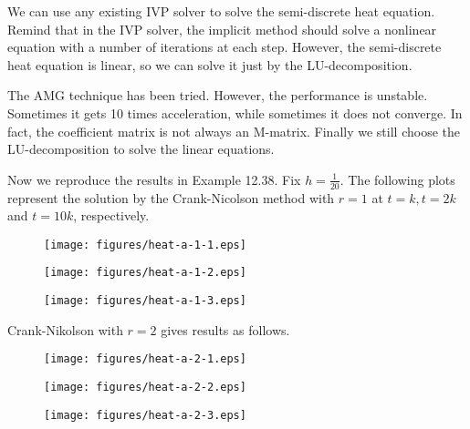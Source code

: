 \documentclass[twocolumn,10pt]{article}
\begin{document}
We can use any existing IVP solver to solve the semi-discrete heat equation. Remind that in the IVP solver, the implicit method should solve a nonlinear equation with a number of iterations at each step. However, the semi-discrete heat equation is linear, so we can solve it just by the LU-decomposition.

The AMG technique has been tried. However, the performance is unstable. Sometimes it gets 10 times acceleration, while sometimes it does not converge. In fact, the coefficient matrix is not always an M-matrix. Finally we still choose the LU-decomposition to solve the linear equations.

Now we reproduce the results in Example 12.38. Fix $h=\frac{1}{20}$. The following plots represent the solution by the Crank-Nicolson method with $r=1$ at $t=k, t=2k$ and $t=10k$, respectively.

\vspace{-.3em}\begin{figure}[H]
    \centering
    \begin{minipage}[t]{0.32\linewidth}
        \centering
        \texttt{[image: figures/heat-a-1-1.eps]}
    \end{minipage}
    \begin{minipage}[t]{0.32\linewidth}
        \centering
        \texttt{[image: figures/heat-a-1-2.eps]}
    \end{minipage}
    \begin{minipage}[t]{0.32\linewidth}
        \centering
        \texttt{[image: figures/heat-a-1-3.eps]}
    \end{minipage}
\end{figure} \vspace{-.5em}

Crank-Nikolson with $r=2$ gives results as follows.

\vspace{-.3em}\begin{figure}[H]
    \centering
    \begin{minipage}[t]{0.32\linewidth}
        \centering
        \texttt{[image: figures/heat-a-2-1.eps]}
    \end{minipage}
    \begin{minipage}[t]{0.32\linewidth}
        \centering
        \texttt{[image: figures/heat-a-2-2.eps]}
    \end{minipage}
    \begin{minipage}[t]{0.32\linewidth}
        \centering
        \texttt{[image: figures/heat-a-2-3.eps]}
    \end{minipage}
\end{figure} \vspace{-.5em}
\end{document}
